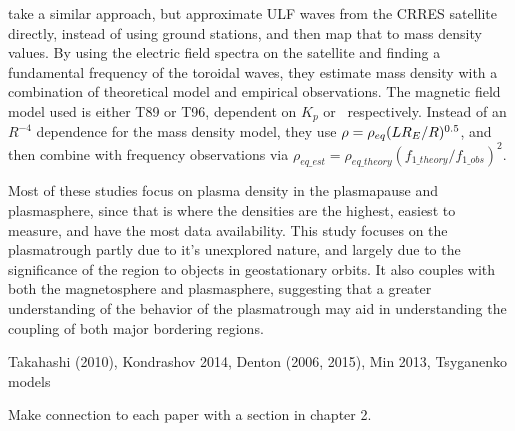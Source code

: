 \cite{Takahashi2006MassDensityInferred} take a similar approach, but approximate ULF waves from the CRRES satellite directly, instead of using ground stations, and then map that to mass density values. By using the electric field spectra on the satellite and finding a fundamental frequency of the toroidal waves, they estimate mass density with a combination of theoretical model and empirical observations. The magnetic field model used is either T89 or T96, dependent on $K_p$ or \dst\  respectively. Instead of an $R^{-4}$ dependence for the mass density model, they use $\rho=\rho_{eq}(LR_E/R)^{0.5}$, and then combine with frequency observations via $\rho_{eq\_est}=\rho_{eq\_theory}(f_{1\_theory}/f_{1\_obs})^2$.

Most of these studies focus on plasma density in the plasmapause and plasmasphere, since that is where the densities are the highest, easiest to measure, and have the most data availability. This study focuses on the plasmatrough partly due to it's unexplored nature, and largely due to the significance of the region to objects in geostationary orbits. It also couples with both the magnetosphere and plasmasphere, suggesting that a greater understanding of the behavior of the plasmatrough may aid in understanding the coupling of both major bordering regions.


\vnote Takahashi (2010), Kondrashov 2014, Denton (2006, 2015), Min 2013, Tsyganenko models

\note Make connection to each paper with a section in chapter 2.

